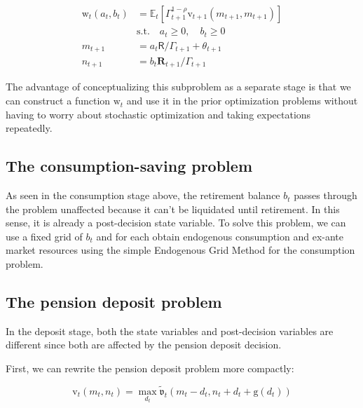 \documentclass{article}
\newcommand{\tShkEmp}{\theta}
\newcommand{\Ex}{\mathbb{E}}
\newcommand{\CRRA}{\rho}
\newcommand{\bRat}{b}
\newcommand{\vFunc}{\mathrm{v}}
\newcommand{\Rfree}{\mathsf{R}}
\newcommand{\PGro}{\Gamma}
\newcommand{\aRat}{a}
\newcommand{\mRat}{m}
\newcommand{\Risky}{\mathbf{R}}
\newcommand{\vOpt}{\tilde{\mathfrak{v}}}
\newcommand{\nRat}{n}
\newcommand{\dRat}{d}
\newcommand{\gFunc}{\mathrm{g}}
\newcommand{\wFunc}{\mathrm{w}}
\begin{document}
\begin{equation}
\begin{split}
    \wFunc_{t}(\aRat_{t}, \bRat_{t}) & = \Ex_{t} \left[ \PGro_{t+1}^{1-\CRRA} \vFunc_{t+1}(\mRat_{t+1}, \mRat_{t+1}) \right] \\
    & \text{s.t.} \quad \aRat_{t} \ge 0, \quad \bRat_{t} \ge 0 \\
    \mRat_{t+1} & = \aRat_{t} \Rfree / \PGro_{t+1}  + \tShkEmp_{t+1} \\
    \nRat_{t+1} & = \bRat_{t} \Risky_{t+1} /  \PGro_{t+1}
  \end{split}
\end{equation}

The advantage of conceptualizing this subproblem as a separate stage is that we can construct a function $\wFunc_{t}$ and use it in the prior optimization problems without having to worry about stochastic optimization and taking expectations repeatedly.

\subsection{The consumption-saving problem}\label{The consumption-saving problem}

As seen in the consumption stage above, the retirement balance $\bRat_{t}$ passes through the problem unaffected because it can't be liquidated until retirement. In this sense, it is already a post-decision state variable. To solve this problem, we can use a fixed grid of $\bRat_{t}$ and for each obtain endogenous consumption and ex-ante market resources using the simple Endogenous Grid Method for the consumption problem.

\subsection{The pension deposit problem}\label{The pension deposit problem}

In the deposit stage, both the state variables and post-decision variables are different since both are affected by the pension deposit decision.

First, we can rewrite the pension deposit problem more compactly:

\begin{equation}
\vFunc_{t}(\mRat_{t}, \nRat_{t}) = \max_{\dRat_{t}}
  \vOpt_{t}(\mRat_{t} - \dRat_{t}, \nRat_{t} + \dRat_{t} + \gFunc(\dRat_{t}))
\end{equation}
\end{document}
